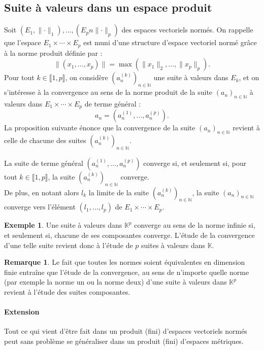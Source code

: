 \documentclass[french]{article}
\newcommand{\N}{\mathbb{N}}
\newcommand{\K}{\mathbb{K}}
\theoremstyle{plain}
\theoremstyle{definition}
\newtheorem*{ex}{Exemple}
\newtheorem*{rmq}{Remarque}
\theoremstyle{remark}
\begin{document}
\subsection{Suite à valeurs dans un espace produit}

Soit $(E_1,\lVert\cdot\rVert_1),\ldots,(E_pn\lVert\cdot\rVert_p)$ des espaces vectoriels normés. On rappelle que l'espace $E_1\times\cdots\times E_p$ est muni d'une structure d'espace vectoriel normé grâce à la norme produit définie par : $$\lVert(x_1,\ldots,x_p)\rVert=\max(\lVert x_1\rVert_2,\ldots,\lVert x_p\rVert_p).$$ Pour tout $k\in\llbracket1,p\rrbracket$, on considère $(a_n^{(k)})_{n\in\N}$ une suite à valeurs dans $E_k$, et on s'intéresse à la convergence au sens de la norme produit de la suite $(a_n)_{n\in\N}$ à valeurs dans $E_1\times\cdots\times E_p$ de terme général : $$a_n=(a_n^{(1)},\ldots,a_n^{(p)}).$$ La proposition suivante énonce que la convergence de la suite $(a_n)_{n\in\N}$ revient à celle de chacune des suites $(a_n^{(k)})_{n\in\N}$.

\begin{prop}[]%
	La suite de terme général $(a_n^{(1)},\ldots,a_n^{(p)})$ converge si, et seulement si, pour tout $k\in\llbracket1,p\rrbracket$, la suite $(a_n^{(k)})_{n\in\N}$ converge.\\
	De plus, en notant alors $l_k$ la limite de la suite $(a_n^{(k)})_{n\in\N}$, la suite $(a_n)_{n\in\N}$ converge vers l'élément $(l_1,\ldots,l_p)$ de $E_1\times\cdots\times E_p$.
\end{prop}

\begin{ex}
	Une suite à valeurs dans $\K^p$ converge au sens de la norme infinie si, et seulement si, chacune de ses composantes converge. L'étude de la convergence d'une telle suite revient donc à l'étude de $p$ suites à valeurs dans $\K$.
\end{ex}

\begin{rmq}
	Le fait que toutes les normes soient équivalentes en dimension finie entraîne que l'étude de la convergence, au sens de n'importe quelle norme (par exemple la norme un ou la norme deux) d'une suite à valeurs dans $\K^p$ revient à l'étude des suites composantes.
\end{rmq}

\paragraph{Extension} Tout ce qui vient d'être fait dans un produit (fini) d'espaces vectoriels normés peut sans problème se généraliser dans un produit (fini) d'espaces métriques.
\end{document}
